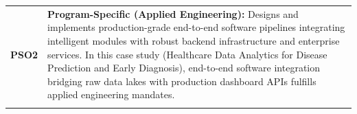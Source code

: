 {\begin{longtable}{@{}>{\centering\arraybackslash}p{1.8cm} p{13.2cm}@{}}
    \addlinespace
\textbf{PSO2} & \textbf{Program-Specific (Applied Engineering):} Designs and implements production-grade end-to-end software pipelines integrating intelligent modules with robust backend infrastructure and enterprise services. In this case study (Healthcare Data Analytics for Disease Prediction and Early Diagnosis), end-to-end software integration bridging raw data lakes with production dashboard APIs fulfills applied engineering mandates. \\
    \addlinespace
    \bottomrule
\end{longtable}}
